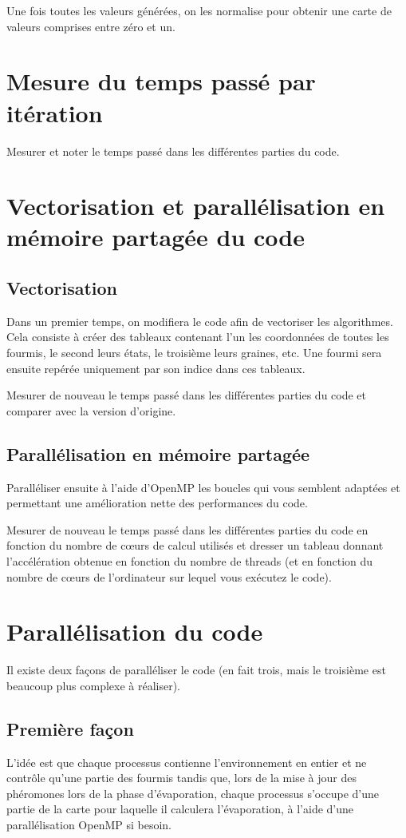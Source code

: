 \documentclass[11pt]{article}
\begin{document}
Une fois toutes les valeurs générées, on les normalise pour obtenir une carte de valeurs comprises entre zéro et un.

\section{Mesure du temps passé par itération}
Mesurer et noter le temps passé dans les différentes parties du code.

\section{Vectorisation et parallélisation en mémoire partagée du code}
\subsection{Vectorisation}
Dans un premier temps, on modifiera le code afin de vectoriser les algorithmes. Cela consiste à créer des tableaux contenant l'un les coordonnées de toutes les fourmis, le second leurs états, le troisième leurs graines, etc. Une fourmi sera ensuite repérée uniquement par son indice dans ces tableaux.

Mesurer de nouveau le temps passé dans les différentes parties du code et comparer avec la version d'origine.

\subsection{Parallélisation en mémoire partagée}
Paralléliser ensuite à l'aide d'OpenMP les boucles qui vous semblent adaptées et permettant une amélioration nette des performances du code.

Mesurer de nouveau le temps passé dans les différentes parties du code en fonction du nombre de cœurs de calcul utilisés et dresser un tableau donnant l'accélération obtenue en fonction du nombre de threads (et en fonction du nombre de cœurs de l'ordinateur sur lequel vous exécutez le code).

\section{Parallélisation du code}
Il existe deux façons de paralléliser le code (en fait trois, mais le troisième est beaucoup plus complexe à réaliser).

\subsection{Première façon}
L'idée est que chaque processus contienne l'environnement en entier et ne contrôle qu'une partie des fourmis tandis que, lors de la mise à jour des phéromones lors de la phase d'évaporation, chaque processus s'occupe d'une partie de la carte pour laquelle il calculera l'évaporation, à l'aide d'une parallélisation OpenMP si besoin.
\end{document}
